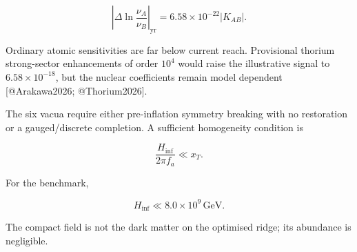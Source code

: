 \documentclass[
]{article}
\begin{document}
\[
\boxed{
\left|\Delta\ln\frac{\nu_A}{\nu_B}\right|_{\mathrm{yr}}
=6.58\times10^{-22}|K_{AB}|.
}
\]

Ordinary atomic sensitivities are far below current reach. Provisional
thorium strong-sector enhancements of order \(10^4\) would raise the
illustrative signal to \(6.58\times10^{-18}\), but the nuclear
coefficients remain model dependent {[}@Arakawa2026; @Thorium2026{]}.

The six vacua require either pre-inflation symmetry breaking with no
restoration or a gauged/discrete completion. A sufficient homogeneity
condition is

\[
\frac{H_{\mathrm{inf}}}{2\pi f_a}\ll x_T.
\]

For the benchmark,

\[
H_{\mathrm{inf}}\ll8.0\times10^9\,\mathrm{GeV}.
\]

The compact field is not the dark matter on the optimised ridge; its
abundance is negligible.
\end{document}

